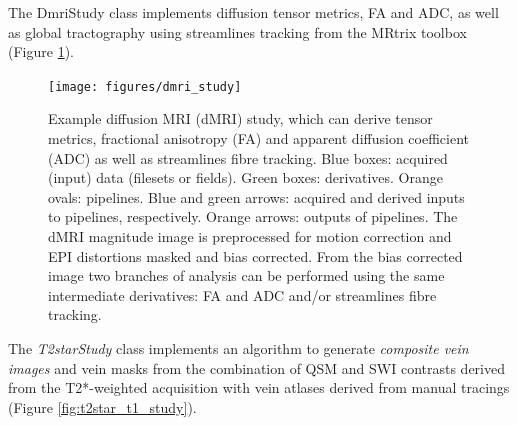\documentclass[smallextended]{svjour3}       %
\begin{document}
The DmriStudy class implements diffusion tensor metrics, FA and ADC, as
well as global tractography using streamlines tracking from the MRtrix
toolbox \citep{tournier_improved_2010,tournier_mrtrix:_2012} (Figure \ref{fig:dmri_study}).

\begin{figure}
	\centering
    \texttt{[image: figures/dmri\_study]}
  \caption{Example diffusion MRI (dMRI) study, which can derive
tensor metrics, fractional anisotropy (FA) and apparent diffusion
coefficient (ADC) as well as streamlines fibre tracking. Blue boxes:
acquired (input) data (filesets or fields). Green boxes: derivatives.
Orange ovals: pipelines. Blue and green arrows: acquired and derived
inputs to pipelines, respectively. Orange arrows: outputs of pipelines.
The dMRI magnitude image is preprocessed for motion correction and EPI
distortions masked and bias corrected. From the bias corrected image two
branches of analysis can be performed using the same intermediate
derivatives: FA and ADC and/or streamlines fibre tracking.}
\label{fig:dmri_study}
\end{figure}

The \emph{T2starStudy} class implements an algorithm to generate
\emph{composite vein images} \citep{ward_combining_2018} and
vein masks \citep{ward_vein_2017} from the combination of QSM and SWI
contrasts derived from the T2*-weighted acquisition with vein atlases
derived from manual tracings (Figure \ref{fig:t2star_t1_study}).
\end{document}
